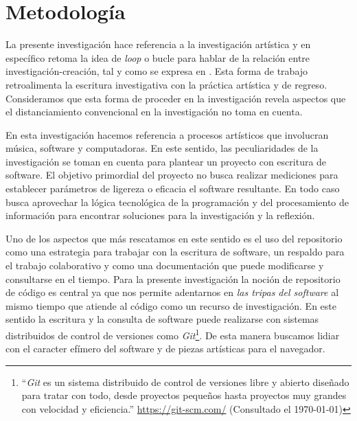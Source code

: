 \section*{Metodología}


La presente investigación hace referencia a la investigación artística y en específico retoma la idea de \textit{loop} o bucle para hablar de la relación entre investigación-creación, tal y como se expresa en \citep{ocelotlMas}. Esta forma de trabajo retroalimenta la escritura investigativa con la práctica artística y de regreso. Consideramos que esta forma de proceder en la investigación revela aspectos que el distanciamiento convencional en la investigación no toma en cuenta.

En esta investigación hacemos referencia a procesos artísticos que involucran música, software y computadoras. En este sentido, las peculiaridades de la investigación se toman en cuenta para plantear un proyecto con escritura de software. El objetivo primordial del proyecto no busca realizar mediciones para establecer parámetros de ligereza o eficacia el software resultante. En todo caso busca aprovechar la lógica tecnológica de la programación y del procesamiento de información para encontrar soluciones para la investigación y la reflexión.

Uno de los aspectos que más rescatamos en este sentido es el uso del repositorio como una estrategia para trabajar con la escritura de software, un respaldo para el trabajo colaborativo y como una documentación que puede modificarse y consultarse en el tiempo. Para la presente investigación la noción de repositorio de código es central ya que nos permite adentarnos en \textit{las tripas del software} al mismo tiempo que atiende al código como un recurso de investigación. En este sentido la escritura y la consulta de software puede realizarse con sistemas distribuidos de control de versiones como \textit{Git}\footnote{``\textit{Git} es un sistema distribuido de control de versiones libre y abierto diseñado para tratar con todo, desde proyectos pequeños hasta proyectos muy grandes con velocidad y eficiencia.'' \url{https://git-scm.com/} (Consultado el \today)}. De esta manera buscamos lidiar con el caracter efímero del software y de piezas artísticas para el navegador. 

